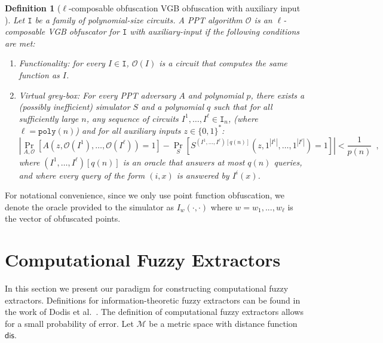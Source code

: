 \documentclass[11pt]{article}
\newcommand{\zo}{\ensuremath{\{0, 1\}}}
\newcommand{\dis}{\ensuremath{\mathsf{dis}}}
\newcommand{\poly}{\ensuremath{\mathtt{poly}}\xspace}
\newtheorem{definition}[theorem]{Definition}
\begin{document}
\begin{definition}[$\ell$-composable obfuscation VGB obfuscation with auxiliary input \cite{bitansky2010strong}]
\label{def:obf} Let $\mathtt{I}$ be a family of polynomial-size circuits.  A PPT algorithm $\mathcal{O}$ is an $\ell$-composable VGB obfuscator for $\mathtt{I}$ with auxiliary-input if the following conditions are met:
\begin{enumerate}
\item \emph{Functionality:} for every $ I \in \mathtt{I}$, $\mathcal{O}(I)$ is a circuit that computes the same function as $I$.
\item \emph{Virtual grey-box:}  For every PPT adversary $A$ and polynomial $p$, there exists a (possibly inefficient) simulator $S$ and a polynomial $q$ such that for all sufficiently large $n$, any  sequence of circuits $I^1,\dots,I^\ell \in \mathtt{I}_n$, (where $\ell=\poly(n)$) and for all auxiliary inputs $z\in \zo^*$:
\[
|\Pr_{A,\mathcal{O}}[A(z,\mathcal{O}(I^1),\dots,\mathcal{O}(I^\ell)) = 1] - \Pr_{S}[S^{(I^1,\dots,I^\ell)[q(n)]}(z, 1^{|I^1|},\dots,1^{|I^\ell|}) = 1] | < \frac{1}{p(n)} \enspace,
\]
where $(I^1,\dots,I^\ell)[q(n)]$ is an oracle that answers at most $q(n)$ queries, and where every query of the form $(i,x)$ is answered by $I^i(x)$.
\end{enumerate}
\end{definition}
For notational convenience, since we only use point function obfuscation, we denote the oracle provided to the simulator as $I_w(\cdot, \cdot)$ where $w = w_1,..., w_\ell$ is the vector of obfuscated points.
\section{Computational Fuzzy Extractors}
\label{sec:fuzzy extractors}

In this section we present our paradigm for constructing computational fuzzy extractors.  Definitions for information-theoretic fuzzy extractors can be found in the work of Dodis et al.~\cite[Sections 2.5--4.1]{DBLP:journals/siamcomp/DodisORS08}.  The definition of computational fuzzy extractors allows for a small probability of error.  Let $\mathcal{M}$ be a metric space with distance function $\dis$.
\end{document}
